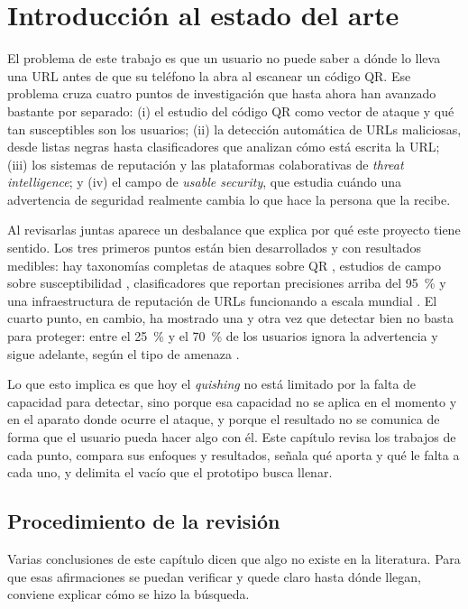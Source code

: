 
\section{Introducción al estado del arte}

El problema de este trabajo es que un usuario no puede saber a dónde lo lleva una URL
antes de que su teléfono la abra al escanear un código QR. Ese problema cruza cuatro
puntos de investigación que hasta ahora han avanzado bastante por separado: (i) el
estudio del código QR como vector de ataque y qué tan susceptibles son los usuarios;
(ii) la detección automática de URLs maliciosas, desde listas negras hasta
clasificadores que analizan cómo está escrita la URL; (iii) los sistemas de
reputación y las plataformas colaborativas de \emph{threat intelligence}; y (iv) el
campo de \emph{usable security}, que estudia cuándo una advertencia de seguridad
realmente cambia lo que hace la persona que la recibe.

Al revisarlas juntas aparece un desbalance que explica por qué este proyecto tiene
sentido. Los tres primeros puntos están bien desarrollados y con resultados medibles:
hay taxonomías completas de ataques sobre QR \cite{krombholz2014qr}, estudios de
campo sobre susceptibilidad \cite{vidas2013qrishing}, clasificadores que reportan
precisiones arriba del 95~\% \cite{ma2009beyond,le2011phishdef} y una infraestructura
de reputación de URLs funcionando a escala mundial
\cite{google_safebrowsing,virustotal_apiv3,phishtank_devinfo,urlhaus_api,misp_project}.
El cuarto punto, en cambio, ha mostrado una y otra vez que detectar bien no basta para
proteger: entre el 25~\% y el 70~\% de los usuarios ignora la advertencia y sigue
adelante, según el tipo de amenaza \cite{akhawe2013alice}.

Lo que esto implica es que hoy el \emph{quishing} no está limitado por la falta de
capacidad para detectar, sino porque esa capacidad no se aplica en el momento y en el
aparato donde ocurre el ataque, y porque el resultado no se comunica de forma que el
usuario pueda hacer algo con él. Este capítulo revisa los trabajos de cada punto,
compara sus enfoques y resultados, señala qué aporta y qué le falta a cada uno, y
delimita el vacío que el prototipo busca llenar.

\subsection*{Procedimiento de la revisión}

Varias conclusiones de este capítulo dicen que algo no existe en la literatura. Para
que esas afirmaciones se puedan verificar y quede claro hasta dónde llegan, conviene
explicar cómo se hizo la búsqueda.

